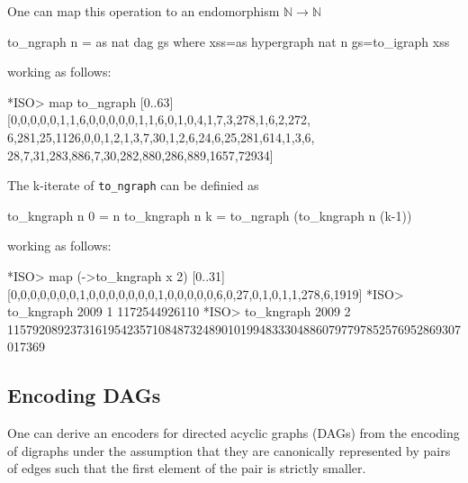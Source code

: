 \documentclass[]{INCLUDES/llncs}
\begin{document}

One can map this operation to an endomorphism $\mathbb{N} \to \mathbb{N}$
\begin{code} 
to_ngraph n = as nat dag gs where 
  xss=as hypergraph nat n
  gs=to_igraph xss
\end{code}
working as follows:
\begin{codex}
*ISO>  map to_ngraph [0..63]
[0,0,0,0,0,1,1,6,0,0,0,0,0,1,1,6,0,1,0,4,1,7,3,278,1,6,2,272,
 6,281,25,1126,0,0,1,2,1,3,7,30,1,2,6,24,6,25,281,614,1,3,6,
 28,7,31,283,886,7,30,282,880,286,889,1657,72934]
\end{codex}
The k-iterate of {\tt to\_ngraph} can be definied as
\begin{code}
to_kngraph n 0 = n
to_kngraph n k = to_ngraph (to_kngraph n (k-1))
\end{code}
working as follows:
\begin{codex}
*ISO> map (\x->to_kngraph x 2) [0..31]
[0,0,0,0,0,0,0,1,0,0,0,0,0,0,0,1,0,0,0,0,0,6,0,27,0,1,0,1,1,278,6,1919]
*ISO> to_kngraph 2009 1
1172544926110
*ISO> to_kngraph 2009 2
115792089237316195423571084873248901019948333048860797797852576952869307017369
\end{codex}

\subsection{Encoding DAGs}
One can derive an encoders for directed acyclic graphs (DAGs) from the encoding
of digraphs under the assumption that they are canonically represented by pairs
of edges such that the first element of the pair is strictly smaller.
\end{document}
